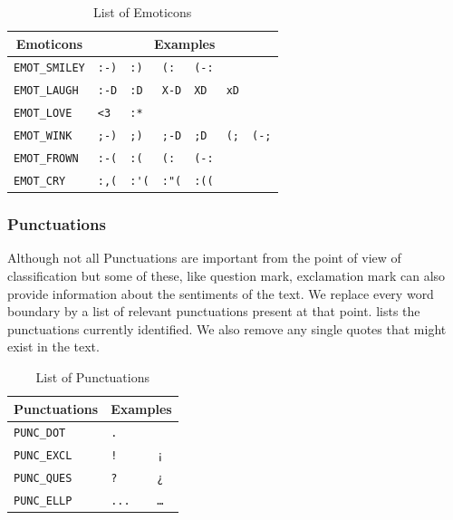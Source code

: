 \begin{table}[h!]
\centering
	\begin{tabular}{|l|llllll|}
	
	\hline
		\multicolumn{1}{|c|}{Emoticons} &
		\multicolumn{6}{c|}{Examples} \\
	\hline
	\verb+EMOT_SMILEY+ 	& \verb+:-)+ 	& \verb+:)+ 	& \verb+(:+ 	& \verb+(-:+ 	& \verb++ 	& \verb++ \\
	\verb+EMOT_LAUGH+ 	& \verb+:-D+ 	& \verb+:D+ 	& \verb+X-D+ 	& \verb+XD+ 	& \verb+xD+ 	& \verb++ \\
	\verb+EMOT_LOVE+ 	& \verb+<3+ 	& \verb+:*+ 	& \verb++ 	& \verb++ 	& \verb++ 	& \verb++ \\
	\verb+EMOT_WINK+ 	& \verb+;-)+ 	& \verb+;)+ 	& \verb+;-D+ 	& \verb+;D+ 	& \verb+(;+ 	& \verb+(-;+ \\
	\verb+EMOT_FROWN+ 	& \verb+:-(+ 	& \verb+:(+ 	& \verb+(:+ 	& \verb+(-:+ 	& \verb++ 	& \verb++ \\
	\verb+EMOT_CRY+ 	& \verb+:,(+ 	& \verb+:'(+ 	& \verb+:"(+ 	& \verb+:((+ 	& \verb++ 	& \verb++ \\
	\hline
	
	\end{tabular}
\caption{List of Emoticons}
\label{tab:emot}
\end{table}

\subsubsection{Punctuations} Although not all Punctuations are important from
the point of view of classification but some of these, like question mark,
exclamation mark can also provide information about the sentiments of the text.
We replace every word boundary by a list of relevant punctuations present at
that point.  lists the punctuations currently identified. We also
remove any single quotes that might exist in the text.

\begin{table}[h!]
\centering
	\begin{tabular}{|l|ll|}
	
	\hline
		\multicolumn{1}{|c|}{Punctuations} &
		\multicolumn{2}{c|}{Examples} \\
	\hline
	\verb+PUNC_DOT+ & \verb+.+ & \verb++ \\
	\verb+PUNC_EXCL+ & \verb+!+ & \verb+¡+ \\
	\verb+PUNC_QUES+ & \verb+?+ & \verb+¿+ \\
	\verb+PUNC_ELLP+ & \verb+...+ & \verb+…+ \\
	\hline

	\end{tabular}
\caption{List of Punctuations}
\label{tab:punc}
\end{table}


